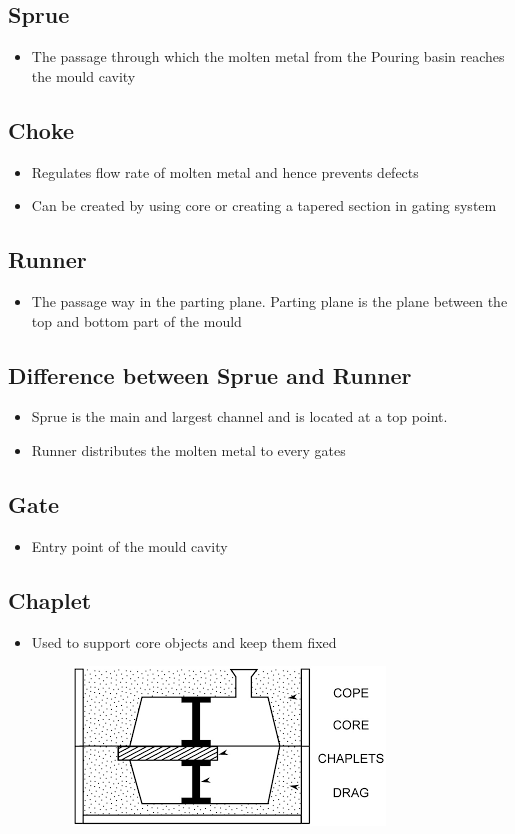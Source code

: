 \documentclass[8pt]{report}
\begin{document}
	\subsection{Sprue}
		\begin{itemize}
			\item The passage through which the molten metal from the Pouring basin reaches the mould cavity
		\end{itemize}
	\subsection{Choke}
		\begin{itemize}
			\item Regulates flow rate of molten metal and hence prevents defects
			\item Can be created by using core or creating a tapered section in gating system
		\end{itemize}
	\subsection{Runner}
		\begin{itemize}
			\item The passage way in the parting plane. Parting plane is the plane between the top and bottom part of the mould
		\end{itemize}
	\subsection{Difference between Sprue and Runner}
		\begin{itemize}
			\item Sprue is the main and largest channel and is located at a top point.
			\item Runner distributes the molten metal to every gates
		\end{itemize}
	\subsection{Gate}
		\begin{itemize}
			\item Entry point of the mould cavity
		\end{itemize}
	\subsection{Chaplet}
		\begin{itemize}
			\item Used to support core objects and keep them fixed
			\begin{figure}[H]
				\centering
				\includegraphics[scale=0.4]{chaplet.png}
			\end{figure}
		\end{itemize}
\end{document}
